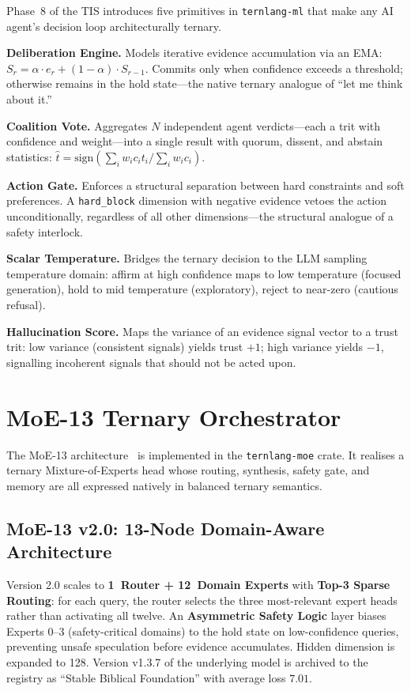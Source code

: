\documentclass[journal,10pt,twocolumn]{IEEEtran}
\begin{document}
Phase~8 of the TIS introduces five primitives in \texttt{ternlang-ml} that
make any AI agent's decision loop architecturally ternary.

\textbf{Deliberation Engine.} Models iterative evidence accumulation via an
EMA: $S_r = \alpha \cdot e_r + (1-\alpha) \cdot S_{r-1}$. Commits only when
confidence exceeds a threshold; otherwise remains in the hold state---the
native ternary analogue of ``let me think about it.''

\textbf{Coalition Vote.} Aggregates $N$ independent agent verdicts---each a
trit with confidence and weight---into a single result with quorum, dissent,
and abstain statistics:
$\hat{t} = \mathrm{sign}\!\left(\sum_i w_i c_i t_i / \sum_i w_i c_i\right)$.

\textbf{Action Gate.} Enforces a structural separation between hard
constraints and soft preferences. A \texttt{hard\_block} dimension with
negative evidence vetoes the action unconditionally, regardless of all other
dimensions---the structural analogue of a safety interlock.

\textbf{Scalar Temperature.} Bridges the ternary decision to the LLM sampling
temperature domain: affirm at high confidence maps to low temperature (focused
generation), hold to mid temperature (exploratory), reject to near-zero
(cautious refusal).

\textbf{Hallucination Score.} Maps the variance of an evidence signal vector
to a trust trit: low variance (consistent signals) yields trust $+1$; high
variance yields $-1$, signalling incoherent signals that should not be acted
upon.

\section{MoE-13 Ternary Orchestrator}
\label{sec:moe}

The MoE-13 architecture~\cite{moe13_2026} is implemented in the
\texttt{ternlang-moe} crate. It realises a ternary Mixture-of-Experts head
whose routing, synthesis, safety gate, and memory are all expressed natively
in balanced ternary semantics.

\subsection{MoE-13 v2.0: 13-Node Domain-Aware Architecture}
\label{subsec:moev2}

Version 2.0 scales to \textbf{1~Router + 12~Domain Experts} with
\textbf{Top-3 Sparse Routing}: for each query, the router selects the three
most-relevant expert heads rather than activating all twelve. An
\textbf{Asymmetric Safety Logic} layer biases Experts 0--3 (safety-critical
domains) to the hold state on low-confidence queries, preventing unsafe
speculation before evidence accumulates. Hidden dimension is expanded to 128.
Version v1.3.7 of the underlying model is archived to the registry as
``Stable Biblical Foundation'' with average loss $7.01$.
\end{document}
